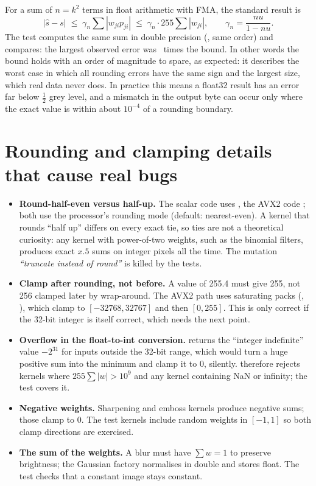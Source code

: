 For a sum of $n=k^2$ terms in float arithmetic with FMA, the standard result is
\[
\bigl|\hat s-s\bigr|\;\le\;\gamma_n\sum|w_{ji}p_{ji}|\;\le\;\gamma_n\cdot255\sum|w_{ji}|,\qquad
\gamma_n=\frac{nu}{1-nu}.
\]
The test  computes the same sum in double precision (, same order) and compares: the largest observed error was \errBoundRatio\ times the bound. In other words the bound holds with an order of magnitude to spare, as expected: it describes the worst case in which all rounding errors have the same sign and the largest size, which real data never does. In practice this means a float32 result has an error far below $\tfrac12$ grey level, and a mismatch in the output byte can occur only where the exact value is within about $10^{-4}$ of a rounding boundary.

\section{Rounding and clamping details that cause real bugs}

\begin{itemize}
\item \textbf{Round-half-even versus half-up.} The scalar code uses , the AVX2 code ; both use the processor's rounding mode (default: nearest-even). A kernel that rounds ``half up'' differs on every exact tie, so ties are not a theoretical curiosity: any kernel with power-of-two weights, such as the binomial filters, produces exact $x.5$ sums on integer pixels all the time. The mutation \emph{``truncate instead of round''} is killed by the tests.
\item \textbf{Clamp after rounding, not before.} A value of 255.4 must give 255, not 256 clamped later by wrap-around. The AVX2 path uses saturating packs (, ), which clamp to $[-32768,32767]$ and then $[0,255]$. This is only correct if the 32-bit integer is itself correct, which needs the next point.
\item \textbf{Overflow in the float-to-int conversion.}  returns the ``integer indefinite'' value $-2^{31}$ for inputs outside the 32-bit range, which would turn a huge positive sum into the minimum and clamp it to 0, silently.  therefore rejects kernels where $255\sum|w|>10^9$ and any kernel containing NaN or infinity; the test  covers it.
\item \textbf{Negative weights.} Sharpening and emboss kernels produce negative sums; those clamp to 0. The test kernels include random weights in $[-1,1]$ so both clamp directions are exercised.
\item \textbf{The sum of the weights.} A blur must have $\sum w=1$ to preserve brightness; the Gaussian factory normalises in double and stores float. The test  checks that a constant image stays constant.
\end{itemize}

